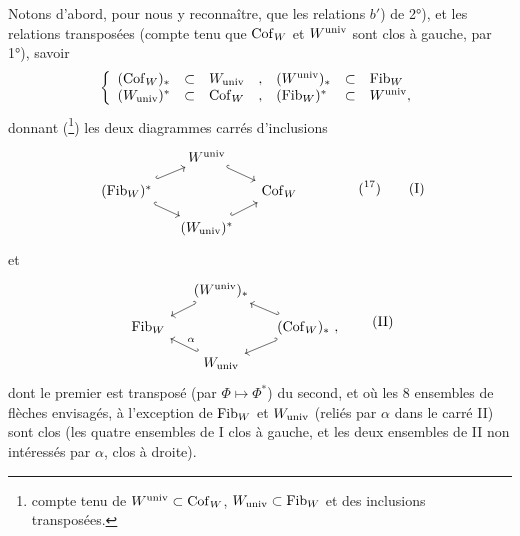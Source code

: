 Notons d'abord, pour nous y reconnaître, que les relations $b'$) de 2°), et les relations transposées (compte tenu que $\mathrm{Cof}_W$ et $W^{\mathrm{univ}}$ sont clos à gauche, par 1°), savoir
\[ \left\{ \begin{array}{lllllll}
(\mathrm{Cof}_W)_* & \subset & W_{\mathrm{univ}} & , & (W^{\mathrm{univ}})_* & \subset & \mathrm{Fib}_W \\
(W_{\mathrm{univ}})^* & \subset & \mathrm{Cof}_W & , & (\mathrm{Fib}_W)^* & \subset & W^{\mathrm{univ}},
\end{array} \right. \]
donnant (\footnote[16]{compte tenu de $W^{\mathrm{univ}} \subset \mathrm{Cof}_W$, $W_{\mathrm{univ}} \subset \mathrm{Fib}_W$ et des inclusions transposées.}) les deux diagrammes carrés d'inclusions
\[
\begin{tikzcd}[column sep=small, row sep=small]
 & W^{\univ} \arrow[dr, hook] & \\
(\Fib_W)^* \arrow[ur, hook] \arrow[dr, hook] & & \Cof_W \\
 & (W_{\univ})^* \arrow[ur, hook] &
\end{tikzcd}
\qquad\qquad (\text{\footnotemark[17]})
\tag*{(I)}
\]
et
\[
\begin{tikzcd}[column sep=small, row sep=small]
 & (W^{\univ})_* \arrow[dl, hook'] & \\
\Fib_W & & (\Cof_W)_*\ , \arrow[ul, hook'] \arrow[dl, hook'] \\
 & W_{\univ} \arrow[ul, hook', "\alpha"'] &
\end{tikzcd}
\tag*{(II)}
\]
dont le premier est transposé (par $\Phi \longmapsto \Phi^*$) du second, et où les 8 ensembles de flèches envisagés, à l'exception de $\mathrm{Fib}_W$ et $W_{\mathrm{univ}}$ (reliés par $\alpha$ dans le carré II) sont clos (les quatre ensembles de I clos à gauche, et les deux ensembles de II non intéressés par $\alpha$, clos à droite).


